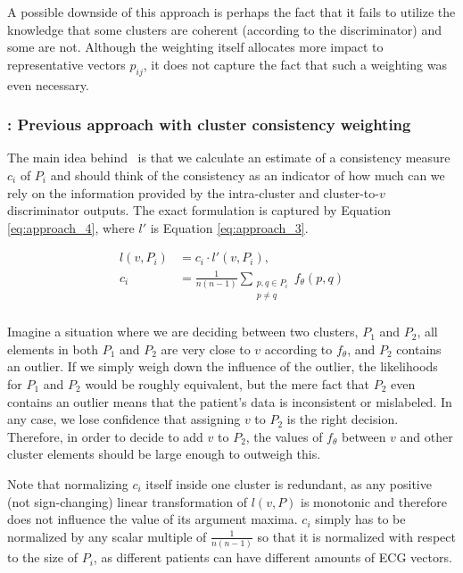 \documentclass[preprint,12pt]{elsarticle}
\begin{document}
A possible downside of this approach is perhaps the fact that it fails to utilize the knowledge that some clusters are coherent (according to the discriminator) and some are not. Although the weighting itself allocates more impact to representative vectors $p_{ij}$, it does not capture the fact that such a weighting was even necessary.

\subsubsection{\aD: Previous approach with cluster consistency weighting}

The main idea behind \aD\ is that we calculate an estimate of a consistency measure $c_i$ of $P_i$ and should think of the consistency as an indicator of how much can we rely on the information provided by the intra-cluster and cluster-to-$v$ discriminator outputs. The exact formulation is captured by Equation \ref{eq:approach_4}, where $l'$ is Equation \ref{eq:approach_3}.

\begin{equation}
    \begin{aligned}
        \label{eq:approach_4}
        l(v, P_i) & = c_i \cdot l'(v, P_i), \\
        c_i & = \frac{1}{n(n -1)}\sum_{\substack{p, q \in P_i \\ p \neq q}} f_\theta (p, q) \\
    \end{aligned}
\end{equation}

Imagine a situation where we are deciding between two clusters, $P_1$ and $P_2$, all elements in both $P_1$ and $P_2$ are very close to $v$ according to $f_\theta$, and $P_2$ contains an outlier. If we simply weigh down the influence of the outlier, the likelihoods for $P_1$ and $P_2$ would be roughly equivalent, but the mere fact that $P_2$ even contains an outlier means that the patient's data is inconsistent or mislabeled. In any case, we lose confidence that assigning $v$ to $P_2$ is the right decision. Therefore, in order to decide to add $v$ to $P_2$, the values of $f_\theta$ between $v$ and other cluster elements should be large enough to outweigh this.

Note that normalizing $c_i$ itself inside one cluster is redundant, as any positive (not sign-changing) linear transformation of $l(v, P)$ is monotonic and therefore does not influence the value of its argument maxima. $c_i$ simply has to be normalized by any scalar multiple of $\frac{1}{n(n-1)}$ so that it is normalized with respect to the size of $P_i$, as different patients can have different amounts of ECG vectors.
\end{document}
